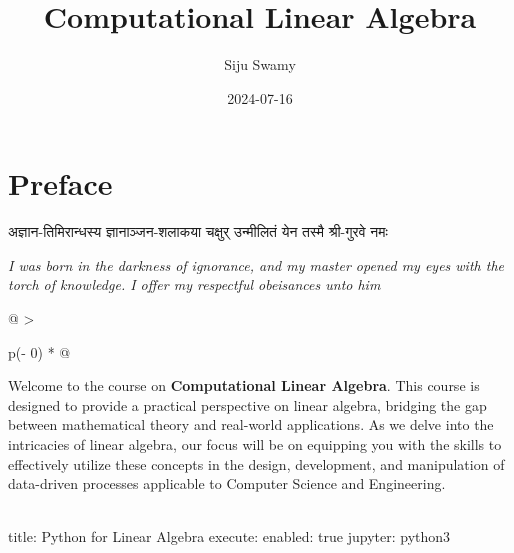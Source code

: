 \documentclass[
  letterpaper,
  DIV=11,
  numbers=noendperiod]{scrreprt}
\title{Computational Linear Algebra}
\author{Siju Swamy}
\date{2024-07-16}
\renewcommand*\contentsname{Table of contents}
\newcommand\contentsname{Table of contents}
\theoremstyle{plain}
\theoremstyle{definition}
\theoremstyle{remark}
\begin{document}
\maketitle

\renewcommand*\contentsname{Table of contents}
{
\hypersetup{linkcolor=}
\setcounter{tocdepth}{2}
\tableofcontents
}


\chapter*{Preface}\label{preface}


अज्ञान-तिमिरान्धस्य ज्ञानाञ्जन-शलाकया चक्षुर् उन्मीलितं येन तस्मै श्री-गुरवे नमः

\emph{I was born in the darkness of ignorance, and my master opened my
eyes with the torch of knowledge. I offer my respectful obeisances unto
him}

\begin{longtable}[]{@{}
  >{\raggedright\arraybackslash}p{(\columnwidth - 0\tabcolsep) * }@{}}
\toprule\noalign{}
\begin{minipage}[b]{\linewidth}\raggedright
Welcome to the course on \textbf{Computational Linear Algebra}. This
course is designed to provide a practical perspective on linear algebra,
bridging the gap between mathematical theory and real-world
applications. As we delve into the intricacies of linear algebra, our
focus will be on equipping you with the skills to effectively utilize
these concepts in the design, development, and manipulation of
data-driven processes applicable to Computer Science and Engineering.
\end{minipage} \\
\midrule\noalign{}
\endhead
\bottomrule\noalign{}
\endlastfoot
title: Python for Linear Algebra execute: enabled: true jupyter:
python3 \\
\end{longtable}
\end{document}

